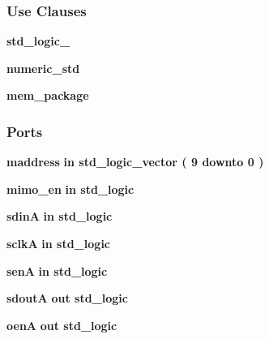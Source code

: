 \subsubsection*{Use Clauses}
 \begin{DoxyCompactItemize}
\item 
{\bf std\+\_\+logic\+\_}   
\item 
{\bf numeric\+\_\+std}   
\item 
{\bf mem\+\_\+package}   
\end{DoxyCompactItemize}
\subsubsection*{Ports}
 \begin{DoxyCompactItemize}
\item 
{\bf maddress}  {\bfseries {\bfseries \textcolor{keywordflow}{in}\textcolor{vhdlchar}{ }}} {\bfseries \textcolor{comment}{std\+\_\+logic\+\_\+vector}\textcolor{vhdlchar}{ }\textcolor{vhdlchar}{(}\textcolor{vhdlchar}{ }\textcolor{vhdlchar}{ } \textcolor{vhdldigit}{9} \textcolor{vhdlchar}{ }\textcolor{keywordflow}{downto}\textcolor{vhdlchar}{ }\textcolor{vhdlchar}{ } \textcolor{vhdldigit}{0} \textcolor{vhdlchar}{ }\textcolor{vhdlchar}{)}\textcolor{vhdlchar}{ }} 
\item 
{\bf mimo\+\_\+en}  {\bfseries {\bfseries \textcolor{keywordflow}{in}\textcolor{vhdlchar}{ }}} {\bfseries \textcolor{comment}{std\+\_\+logic}\textcolor{vhdlchar}{ }} 
\item 
{\bf sdinA}  {\bfseries {\bfseries \textcolor{keywordflow}{in}\textcolor{vhdlchar}{ }}} {\bfseries \textcolor{comment}{std\+\_\+logic}\textcolor{vhdlchar}{ }} 
\item 
{\bf sclkA}  {\bfseries {\bfseries \textcolor{keywordflow}{in}\textcolor{vhdlchar}{ }}} {\bfseries \textcolor{comment}{std\+\_\+logic}\textcolor{vhdlchar}{ }} 
\item 
{\bf senA}  {\bfseries {\bfseries \textcolor{keywordflow}{in}\textcolor{vhdlchar}{ }}} {\bfseries \textcolor{comment}{std\+\_\+logic}\textcolor{vhdlchar}{ }} 
\item 
{\bf sdoutA}  {\bfseries {\bfseries \textcolor{keywordflow}{out}\textcolor{vhdlchar}{ }}} {\bfseries \textcolor{comment}{std\+\_\+logic}\textcolor{vhdlchar}{ }} 
\item 
{\bf oenA}  {\bfseries {\bfseries \textcolor{keywordflow}{out}\textcolor{vhdlchar}{ }}} {\bfseries \textcolor{comment}{std\+\_\+logic}\textcolor{vhdlchar}{ }} 
\item 

\end{DoxyCompactItemize}
